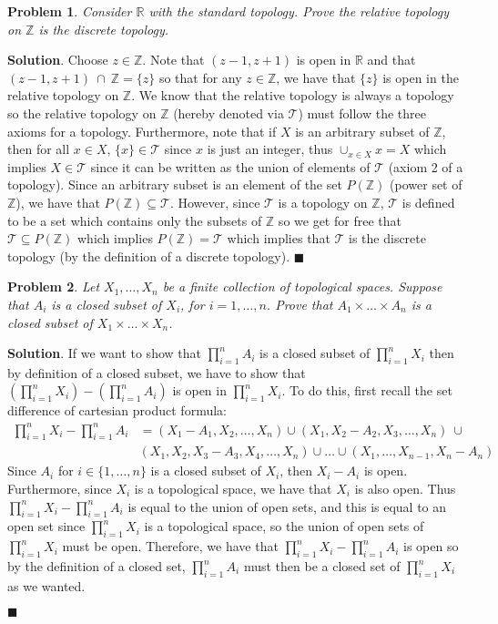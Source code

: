 \documentclass[12pt]{article}
\renewcommand{\=}[1]{\stackrel{#1}{=}} %
\providecommand{\RR}{\mathbb{R}}
\providecommand{\T}{\mathcal{T}}
\newtheorem{p}{Problem}[section]
\theoremstyle{definition}
\newenvironment{s}{%
        \begin{trivlist} \item \textbf{Solution}. }{%
            \hspace*{\fill} $\blacksquare$\end{trivlist}}%
\begin{document}
\begin{p}
    Consider $\RR$ with the standard topology. Prove the relative topology on $\mathbb{Z}$ is the discrete topology.
\end{p}
\begin{s}
    Choose $z\in\mathbb{Z}$. Note that $(z-1,z+1)$ is open in $\RR$ and that $(z-1,z+1)\:\cap\:\mathbb{Z} = \{z\}$ so that for any
    $z\in\mathbb{Z}$, we have that $\{z\}$ is open in the relative topology on $\mathbb{Z}$. We know that the relative topology is always a topology
    so the relative topology on $\mathbb{Z}$ (hereby denoted via $\T$) must follow the three axioms for a topology. Furthermore, note that if
    $X$ is an arbitrary subset of $\mathbb{Z}$, then for all $x\in X$,
    $\{x\}\in\T$ since $x$ is just an integer, thus $\cup_{x\in X} x = X$ which implies $X\in\T$ since it can be written as the union of elements
    of $\T$ (axiom 2 of a topology). Since an arbitrary subset is an element of the set $P(\mathbb{Z})$ (power set of $\mathbb{Z}$), we have that
    $P(\mathbb{Z}) \subseteq \T$. However, since $\T$ is a topology on $\mathbb{Z}$, $\T$ is defined to be a set which contains only the subsets
    of $\mathbb{Z}$ so we get for free that $\T \subseteq P(\mathbb{Z})$ which implies $P(\mathbb{Z}) = \T$ which implies that $\T$ is the discrete
    topology (by the definition of a discrete topology).
\end{s}

\newpage

\begin{p}
    Let $X_1,\hdots,X_n$ be a finite collection of topological spaces. Suppose that $A_i$ is a closed subset of $X_i$, for $i=1,\hdots,n$. Prove
    that $A_1\times\hdots\times A_n$ is a closed subset of $X_1\times\hdots\times X_n$.
\end{p}
\begin{s}
    If we want to show that $\prod_{i=1}^n A_i$ is a closed subset of $\prod_{i=1}^n X_i$ then by definition of a closed subset, we have to show
    that $(\prod_{i=1}^n X_i) - (\prod_{i=1}^n A_i)$ is open in $\prod_{i=1}^n X_i$. To do this, first recall the set difference of cartesian
    product formula:
    \begin{align*}
        \prod_{i=1}^n X_i - \prod_{i=1}^n A_i &= (X_1-A_1,X_2,\hdots,X_n) \cup (X_1, X_2-A_2, X_3, \hdots, X_n)\: \cup \\
            &(X_1, X_2, X_3-A_3, X_4, \hdots, X_n) \cup \hdots \cup (X_1,\hdots,X_{n-1},X_n-A_n)
    \end{align*}
    Since $A_i$ for $i\in\{1,\hdots,n\}$ is a closed subset of $X_i$, then $X_i - A_i$ is open. Furthermore, since $X_i$ is a topological space,
    we have that $X_i$ is also open. Thus $\prod_{i=1}^n X_i - \prod_{i=1}^n A_i$ is equal to the union of open sets, and this is equal to an open
    set since $\prod_{i=1}^n X_i$ is a topological space, so the union of open sets of $\prod_{i=1}^n X_i$ must be open. Therefore, we have that
    $\prod_{i=1}^n X_i - \prod_{i=1}^n A_i$ is open so by the definition of a closed set, $\prod_{i=1}^n A_i$ must then be a closed set of
    $\prod_{i=1}^n X_i$ as we wanted.

\end{s}
\end{document}

